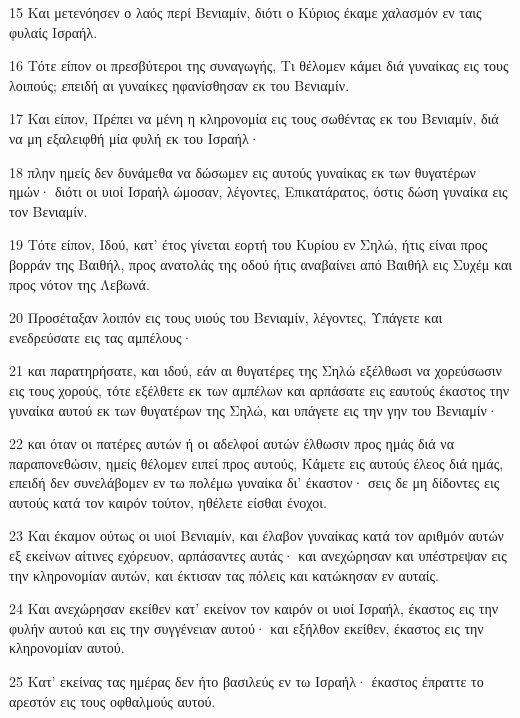 \par 15 Και μετενόησεν ο λαός περί Βενιαμίν, διότι ο Κύριος έκαμε χαλασμόν εν ταις φυλαίς Ισραήλ.
\par 16 Τότε είπον οι πρεσβύτεροι της συναγωγής, Τι θέλομεν κάμει διά γυναίκας εις τους λοιπούς; επειδή αι γυναίκες ηφανίσθησαν εκ του Βενιαμίν.
\par 17 Και είπον, Πρέπει να μένη η κληρονομία εις τους σωθέντας εκ του Βενιαμίν, διά να μη εξαλειφθή μία φυλή εκ του Ισραήλ·
\par 18 πλην ημείς δεν δυνάμεθα να δώσωμεν εις αυτούς γυναίκας εκ των θυγατέρων ημών· διότι οι υιοί Ισραήλ ώμοσαν, λέγοντες, Επικατάρατος, όστις δώση γυναίκα εις τον Βενιαμίν.
\par 19 Τότε είπον, Ιδού, κατ' έτος γίνεται εορτή του Κυρίου εν Σηλώ, ήτις είναι προς βορράν της Βαιθήλ, προς ανατολάς της οδού ήτις αναβαίνει από Βαιθήλ εις Συχέμ και προς νότον της Λεβωνά.
\par 20 Προσέταξαν λοιπόν εις τους υιούς του Βενιαμίν, λέγοντες, Υπάγετε και ενεδρεύσατε εις τας αμπέλους·
\par 21 και παρατηρήσατε, και ιδού, εάν αι θυγατέρες της Σηλώ εξέλθωσι να χορεύσωσιν εις τους χορούς, τότε εξέλθετε εκ των αμπέλων και αρπάσατε εις εαυτούς έκαστος την γυναίκα αυτού εκ των θυγατέρων της Σηλώ, και υπάγετε εις την γην του Βενιαμίν·
\par 22 και όταν οι πατέρες αυτών ή οι αδελφοί αυτών έλθωσιν προς ημάς διά να παραπονεθώσιν, ημείς θέλομεν ειπεί προς αυτούς, Κάμετε εις αυτούς έλεος διά ημάς, επειδή δεν συνελάβομεν εν τω πολέμω γυναίκα δι' έκαστον· σεις δε μη δίδοντες εις αυτούς κατά τον καιρόν τούτον, ηθέλετε είσθαι ένοχοι.
\par 23 Και έκαμον ούτως οι υιοί Βενιαμίν, και έλαβον γυναίκας κατά τον αριθμόν αυτών εξ εκείνων αίτινες εχόρευον, αρπάσαντες αυτάς· και ανεχώρησαν και υπέστρεψαν εις την κληρονομίαν αυτών, και έκτισαν τας πόλεις και κατώκησαν εν αυταίς.
\par 24 Και ανεχώρησαν εκείθεν κατ' εκείνον τον καιρόν οι υιοί Ισραήλ, έκαστος εις την φυλήν αυτού και εις την συγγένειαν αυτού· και εξήλθον εκείθεν, έκαστος εις την κληρονομίαν αυτού.
\par 25 Κατ' εκείνας τας ημέρας δεν ήτο βασιλεύς εν τω Ισραήλ· έκαστος έπραττε το αρεστόν εις τους οφθαλμούς αυτού.


